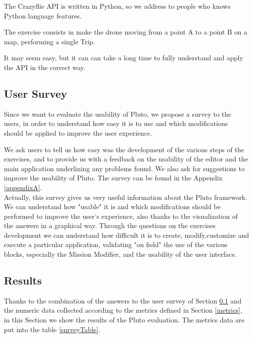 The Crazyflie API is written in Python, so we address to people who knows Python language features.

The exercise consists in make the drone moving from a point A to a point B on a map, performing a single Trip.

It may seem easy, but it can can take a long time to fully understand and apply the API in the correct way.


\subsection{User Survey}\label{survey}

Since we want to evaluate the usability of Pluto, we propose a survey to the users, in order to understand how easy it is to use and which modifications should be applied to improve the user experience.

We ask users to tell us how easy was the development of the various steps of the exercises, and to provide us with a feedback on the usability of the editor and the main application underlining any problems found.
We also ask for suggestions to improve the usability of Pluto.
The survey can be found in the Appendix \ref{appendixA}.
\\


Actually, this survey gives us very useful information about the Pluto framework. We can understand how "usable" it is and which modifications should be performed to improve the user's experience, also thanks to the visualization of the answers in a graphical way.
Through the questions on the exercises development we can understand how difficult it is to create, modify,customize and execute a particular application, validating "on field" the use of the various blocks, especially the Mission Modifier, and the usability of the user interface.

\subsection{Results}\label{surveyResult}

Thanks to the combination of the answers to the user survey of Section \ref{survey} and the numeric data collected according to the metrics defined in Section \ref{metrics}, in this Section we show the results of the Pluto evaluation.
The metrics data are put into the table \ref{surveyTable}.
\\

